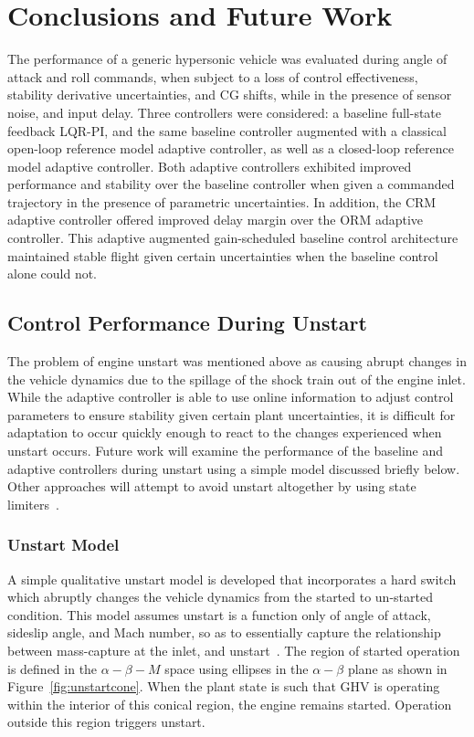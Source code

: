 \chapter{Conclusions and Future Work}

The performance of a generic hypersonic vehicle was evaluated during angle of attack and roll commands, when subject to a loss of control effectiveness, stability derivative uncertainties, and CG shifts, while in the presence of sensor noise, and input delay.
Three controllers were considered: a baseline full-state feedback LQR-PI, and the same baseline controller augmented with a classical open-loop reference model adaptive controller, as well as a closed-loop reference model adaptive controller.
Both  adaptive controllers exhibited improved performance and stability over the baseline controller when given a commanded trajectory in the presence of parametric uncertainties.
In addition, the CRM adaptive controller offered improved delay margin over the ORM adaptive controller.
This adaptive augmented gain-scheduled baseline control architecture maintained stable flight given certain uncertainties when the baseline control alone could not.

\section{Control Performance During Unstart}\label{sec:unstart}

The problem of engine unstart was mentioned above as causing abrupt changes in the vehicle dynamics due to the spillage of the shock train out of the engine inlet.
While the adaptive controller is able to use online information to adjust control parameters to ensure stability given certain plant uncertainties, it is difficult for adaptation to occur quickly enough to react to the changes experienced when unstart occurs.
Future work will examine the performance of the baseline and adaptive controllers during unstart using a simple model discussed briefly below.
Other approaches will attempt to avoid unstart altogether by using state limiters\ \cite{muse.constraints.2011,lavretsky.statelimiting.2010}.

\subsection{Unstart Model}\label{sec:unstartmodel}

A simple qualitative unstart model is developed that incorporates a hard switch which abruptly changes the vehicle dynamics from the started to un-started condition.
This model assumes unstart is a function only of angle of attack, sideslip angle, and Mach number, so as to essentially capture the relationship between mass-capture at the inlet, and unstart\ \cite{bolender.modelling.2009}.
The region of started operation is defined in the $\alpha-\beta-M$ space using ellipses in the $\alpha-\beta$ plane as shown in Figure~\ref{fig:unstartcone}.
When the plant state is such that GHV is operating within the interior of this conical region, the engine remains started.
Operation outside this region triggers unstart.

